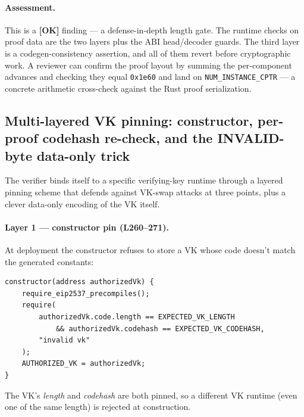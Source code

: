 \paragraph{Assessment.} This is a \textcolor{tracegreen}{\textbf{[OK]}}
finding --- a defense-in-depth length gate. The runtime checks on
proof data are the two layers plus the ABI head/decoder guards. The
third layer is a codegen-consistency assertion, and all of them
revert before cryptographic work. A reviewer can confirm
the proof layout by summing the per-component advances and checking
they equal \texttt{0x1e60} and land on \texttt{NUM\_\allowbreak{}INSTANCE\_\allowbreak{}CPTR}
--- a concrete arithmetic cross-check against the Rust proof
serialization.

\subsection{Multi-layered VK pinning: constructor, per-proof codehash re-check, and the INVALID-byte data-only trick}
\label{sec:pr-vk-pin}

The verifier binds itself to a specific verifying-key runtime through
a layered pinning scheme that defends against VK-swap attacks at
three points, plus a clever data-only encoding of the VK itself.

\paragraph{Layer 1 --- constructor pin (L260--271).} At deployment
the constructor refuses to store a VK whose code doesn't match the
generated constants:
\begin{lstlisting}[style=plain]
constructor(address authorizedVk) {
    require_eip2537_precompiles();
    require(
        authorizedVk.code.length == EXPECTED_VK_LENGTH
            && authorizedVk.codehash == EXPECTED_VK_CODEHASH,
        "invalid vk"
    );
    AUTHORIZED_VK = authorizedVk;
}
\end{lstlisting}
The VK's \emph{length} and \emph{codehash} are both pinned, so a
different VK runtime (even one of the same length) is rejected at
construction.

